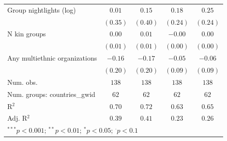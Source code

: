 \begin{tabular}{l c c c c}
Group nightlights (log)                     & $0.01$       & $0.15$         & $0.18$       & $0.25$        \\
                                            & $(0.35)$     & $(0.40)$       & $(0.24)$     & $(0.24)$      \\
N kin groups                                & $0.00$       & $0.01$         & $-0.00$      & $0.00$        \\
                                            & $(0.01)$     & $(0.01)$       & $(0.00)$     & $(0.00)$      \\
Any multiethnic organizations               & $-0.16$      & $-0.17$        & $-0.05$      & $-0.06$       \\
                                            & $(0.20)$     & $(0.20)$       & $(0.09)$     & $(0.09)$      \\
\hline
Num. obs.                                   & $138$        & $138$          & $138$        & $138$         \\
Num. groups: countries\_gwid                & $62$         & $62$           & $62$         & $62$          \\
R$^2$                                       & $0.70$       & $0.72$         & $0.63$       & $0.65$        \\
Adj. R$^2$                                  & $0.39$       & $0.41$         & $0.23$       & $0.26$        \\
\hline
\multicolumn{5}{l}{\scriptsize{$^{***}p<0.001$; $^{**}p<0.01$; $^{*}p<0.05$; $^{\cdot}p<0.1$}}
\end{tabular}
